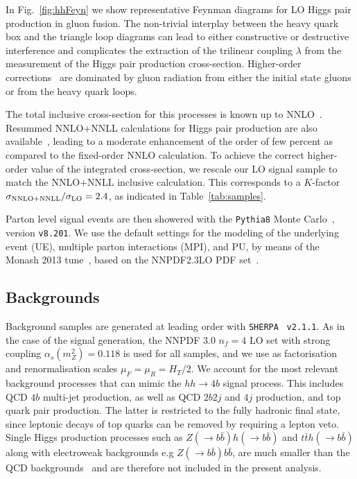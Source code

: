 In Fig.~\ref{fig:hhFeyn} we show representative Feynman diagrams
    for LO Higgs pair production in gluon fusion.
    The non-trivial interplay between the heavy quark box and the triangle loop diagrams
    can lead to either constructive or destructive interference
    and complicates the extraction of
    the trilinear coupling
    $\lambda$ from the measurement of the Higgs pair
    production cross-section.
    Higher-order corrections~\cite{deFlorian:2013jea,Frederix:2014hta}
    are dominated by gluon radiation
    from either the initial state gluons or from the heavy quark loops.

    The total inclusive cross-section for this processes is
    known up to NNLO~\cite{deFlorian:2013jea}.
    Resummed NNLO+NNLL calculations for Higgs pair production are
    also available~\cite{deFlorian:2015moa},
leading to a moderate enhancement of the order of
few percent as compared to the fixed-order NNLO calculation.
%
To achieve the correct higher-order value of the
integrated cross-section, we rescale our LO signal sample to match the
NNLO+NNLL
inclusive calculation.
%
This corresponds to
a $K$-factor $\sigma_{\rm NNLO+NNLL}/\sigma_{\rm LO}=2.4$, as indicated
in Table~\ref{tab:samples}.


Parton level signal events are then showered with the {\tt Pythia8} Monte
Carlo~\cite{Sjostrand:2007gs,Sjostrand:2014zea}, version {\tt v8.201}.
%
We use the default settings for the modeling
of the underlying event (UE), multiple parton
interactions (MPI), and PU, by means
of the Monash 2013 tune~\cite{Skands:2014pea},
based on the NNPDF2.3LO PDF set~\cite{Ball:2012cx,Ball:2013hta}.
%


\subsection{Backgrounds}

Background samples are generated at leading order
with {\tt SHERPA}~\cite{Gleisberg:2008ta} {\tt v2.1.1}.
%
As in the case of the signal generation,
the NNPDF 3.0 $n_f = 4$ LO set with strong coupling
$\alpha_s(m_Z^2)=0.118$ is used for all samples, and
we use as
factorisation and renormalisation scales $\mu_F=\mu_R=H_T/2$.
%
We account for the most relevant background
processes that can mimic the
 $hh\to 4b$ signal process.
%
This includes  QCD $4b$ multi-jet production, as well as
QCD $2b2j$ and $4j$ production, and top quark pair
production.
%
The latter is restricted to the fully hadronic final state,
since 
leptonic decays of top quarks can be removed by requiring
a lepton veto.
%
Single Higgs production processes such as $Z(\to b\bar{b})h(\to b\bar{b})$
and $t\bar{t}h(\to b\bar{b})$ along with electroweak backgrounds e.g $Z(\to b\bar{b})b\bar{b}$,
are much smaller than the QCD backgrounds~\cite{Wardrope:2014kya,deLima:2014dta}
and are therefore not included in the present analysis.
%



